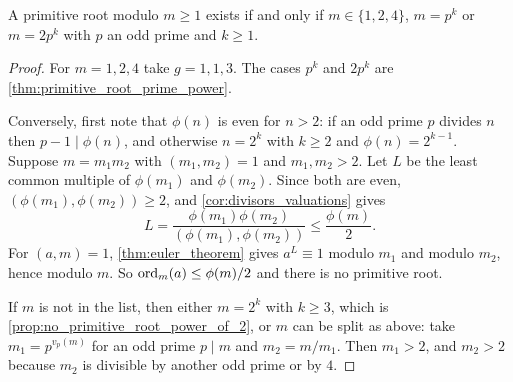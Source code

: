 \begin{theorem}\label{thm:primitive_root_classification}
    A primitive root modulo $m \ge 1$ exists if and only if $m \in \{1, 2, 4\}$, $m = p^k$ or $m = 2p^k$ with $p$ an odd prime and $k \ge 1$.
\end{theorem}
\begin{proof}
    For $m = 1, 2, 4$ take $g = 1, 1, 3$. The cases $p^k$ and $2p^k$ are \cref{thm:primitive_root_prime_power}.

    Conversely, first note that $\phi(n)$ is even for $n > 2$: if an odd prime $p$ divides $n$ then $p - 1 \mid \phi(n)$, and otherwise $n = 2^k$ with $k \ge 2$ and $\phi(n) = 2^{k-1}$. Suppose $m = m_1m_2$ with $(m_1, m_2) = 1$ and $m_1, m_2 > 2$. Let $L$ be the least common multiple of $\phi(m_1)$ and $\phi(m_2)$. Since both are even, $(\phi(m_1),\phi(m_2)) \ge 2$, and \cref{cor:divisors_valuations} gives
    \begin{equation*}
        L = \frac{\phi(m_1)\phi(m_2)}{(\phi(m_1),\phi(m_2))} \le \frac{\phi(m)}{2}.
    \end{equation*}
    For $(a,m) = 1$, \cref{thm:euler_theorem} gives $a^L \equiv 1$ modulo $m_1$ and modulo $m_2$, hence modulo $m$. So $\ord_m(a) \le \phi(m)/2$ and there is no primitive root.

    If $m$ is not in the list, then either $m = 2^k$ with $k \ge 3$, which is \cref{prop:no_primitive_root_power_of_2}, or $m$ can be split as above: take $m_1 = p^{v_p(m)}$ for an odd prime $p \mid m$ and $m_2 = m/m_1$. Then $m_1 > 2$, and $m_2 > 2$ because $m_2$ is divisible by another odd prime or by $4$.
\end{proof}
